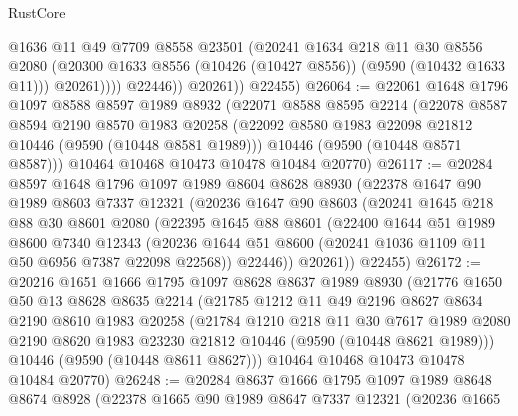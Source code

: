\begin{lexlean}{RustCore}
\begin{coremodule}
                    @1636
                    @11
                    @49
                    @7709
                    @8558
                    @23501
                    (@20241
                      @1634
                      @218
                      @11
                      @30
                      @8556
                      @2080
                      (@20300 @1633 @8556 (@10426 (@10427 @8556)) (@9590 (@10432 @1633 @11)))
                      @20261))))
              @22446))
          @20261))
      @22455)
@26064 := @22061
    @1648
    @1796
    @1097
    @8588
    @8597
    @1989
    @8932
    (@22071
      @8588
      @8595
      @2214
      (@22078
        @8587
        @8594
        @2190
        @8570
        @1983
        @20258
        (@22092 @8580 @1983 @22098 @21812 @10446 (@9590 (@10448 @8581 @1989)))
        @10446
        (@9590 (@10448 @8571 @8587)))
      @10464
      @10468
      @10473
      @10478
      @10484
      @20770)
@26117 := @20284
    @8597
    @1648
    @1796
    @1097
    @1989
    @8604
    @8628
    @8930
    (@22378
      @1647
      @90
      @1989
      @8603
      @7337
      @12321
      (@20236
        @1647
        @90
        @8603
        (@20241
          @1645
          @218
          @88
          @30
          @8601
          @2080
          (@22395
            @1645
            @88
            @8601
            (@22400
              @1644
              @51
              @1989
              @8600
              @7340
              @12343
              (@20236 @1644 @51 @8600 (@20241 @1036 @1109 @11 @50 @6956 @7387 @22098 @22568))
              @22446))
          @20261))
      @22455)
@26172 := @20216
    @1651
    @1666
    @1795
    @1097
    @8628
    @8637
    @1989
    @8930
    (@21776
      @1650
      @50
      @13
      @8628
      @8635
      @2214
      (@21785
        @1212
        @11
        @49
        @2196
        @8627
        @8634
        @2190
        @8610
        @1983
        @20258
        (@21784
          @1210
          @218
          @11
          @30
          @7617
          @1989
          @2080
          @2190
          @8620
          @1983
          @23230
          @21812
          @10446
          (@9590 (@10448 @8621 @1989)))
        @10446
        (@9590 (@10448 @8611 @8627)))
      @10464
      @10468
      @10473
      @10478
      @10484
      @20770)
@26248 := @20284
    @8637
    @1666
    @1795
    @1097
    @1989
    @8648
    @8674
    @8928
    (@22378
      @1665
      @90
      @1989
      @8647
      @7337
      @12321
      (@20236
        @1665

\end{coremodule}
\end{lexlean}
